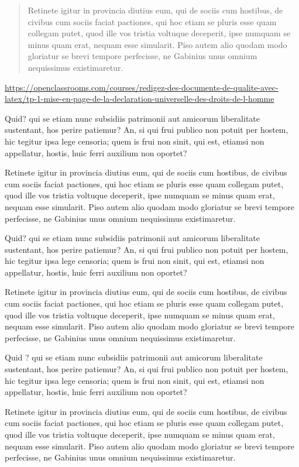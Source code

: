 \documentclass{report}
\begin{document}
\begin{quotation}
 \og Retinete igitur in provincia diutius eum, qui de sociis
cum hostibus, de civibus cum sociis faciat pactiones, qui hoc etiam se pluris esse
quam collegam putet, quod ille vos tristia voltuque deceperit, ipse numquam se minus
quam erat, nequam esse simularit. Piso autem alio quodam modo gloriatur se brevi
tempore perfecisse,
ne Gabinius unus omnium nequissimus existimaretur.\fg
\end{quotation}


\url{https://openclassrooms.com/courses/redigez-des-documents-de-qualite-avec-latex/tp-1-mise-en-page-de-la-declaration-universelle-des-droits-de-l-homme}

Quid? qui se etiam nunc subsidiis patrimonii aut amicorum liberalitate sustentant,
hos perire patiemur? An, si qui frui publico non potuit per hostem, hic tegitur ipsa
lege censoria; quem is frui non sinit, qui est, etiamsi non appellatur, hostis, huic
ferri auxilium non oportet?

Retinete igitur in provincia diutius eum, qui de sociis
cum hostibus, de civibus cum sociis faciat pactiones, qui hoc etiam se pluris esse
quam collegam putet, quod ille vos tristia voltuque deceperit, ipse numquam se minus
quam erat, nequam esse simularit. Piso autem alio quodam modo gloriatur se brevi
tempore perfecisse,
ne Gabinius unus omnium nequissimus existimaretur.

Quid? qui se etiam nunc subsidiis patrimonii aut amicorum liberalitate sustentant,
hos perire patiemur? An, si qui frui publico non potuit per hostem, hic tegitur ipsa
lege censoria; quem is frui non sinit, qui est, etiamsi non appellatur, hostis, huic
ferri auxilium non oportet?

Retinete igitur in provincia diutius eum, qui de sociis
cum hostibus, de civibus cum sociis faciat pactiones, qui hoc etiam se pluris esse
quam collegam putet, quod ille vos tristia voltuque deceperit, ipse numquam se minus
quam erat, nequam esse simularit. Piso autem alio quodam modo gloriatur se brevi
tempore perfecisse,
ne Gabinius unus omnium nequissimus existimaretur.

{\LARGE Quid ?}
qui se etiam nunc subsidiis patrimonii aut amicorum liberalitate sustentant,
hos perire patiemur? An, si qui frui publico non potuit per hostem, hic tegitur ipsa
lege censoria; quem is frui non sinit, qui est, etiamsi non appellatur, hostis, huic
ferri auxilium non oportet?

\begin{bf}
Retinete igitur in provincia diutius eum, qui de sociis
cum hostibus, de civibus cum sociis faciat pactiones, qui hoc etiam se pluris esse
quam collegam putet, quod ille vos tristia voltuque deceperit, ipse numquam se minus
quam erat, nequam esse simularit. Piso autem alio quodam modo gloriatur se brevi
tempore perfecisse,
ne Gabinius unus omnium nequissimus existimaretur.
\end{bf}
\end{document}
